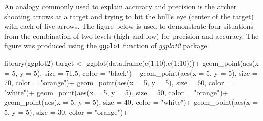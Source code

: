 \documentclass[
  letterpaper,
  DIV=11,
  numbers=noendperiod]{scrreprt}
\newenvironment{Shaded}{\begin{snugshade}}{\end{snugshade}}
\newcommand{\AttributeTok}[1]{\textcolor[rgb]{0.40,0.45,0.13}{#1}}
\newcommand{\DecValTok}[1]{\textcolor[rgb]{0.68,0.00,0.00}{#1}}
\newcommand{\FloatTok}[1]{\textcolor[rgb]{0.68,0.00,0.00}{#1}}
\newcommand{\FunctionTok}[1]{\textcolor[rgb]{0.28,0.35,0.67}{#1}}
\newcommand{\NormalTok}[1]{\textcolor[rgb]{0.00,0.23,0.31}{#1}}
\newcommand{\OtherTok}[1]{\textcolor[rgb]{0.00,0.23,0.31}{#1}}
\newcommand{\SpecialCharTok}[1]{\textcolor[rgb]{0.37,0.37,0.37}{#1}}
\newcommand{\StringTok}[1]{\textcolor[rgb]{0.13,0.47,0.30}{#1}}
\begin{document}
An analogy commonly used to explain accuracy and precision is the archer
shooting arrows at a target and trying to hit the bull's eye (center of
the target) with each of five arrows. The figure below is used to
demonstrate four situations from the combination of two levels (high and
low) for precision and accuracy. The figure was produced using the
\texttt{ggplot} function of \emph{ggplot2} package.

\begin{Shaded}
\begin{Highlighting}[]
\FunctionTok{library}\NormalTok{(ggplot2)}
\NormalTok{target }\OtherTok{\textless{}{-}} 
  \FunctionTok{ggplot}\NormalTok{(}\FunctionTok{data.frame}\NormalTok{(}\FunctionTok{c}\NormalTok{(}\DecValTok{1}\SpecialCharTok{:}\DecValTok{10}\NormalTok{),}\FunctionTok{c}\NormalTok{(}\DecValTok{1}\SpecialCharTok{:}\DecValTok{10}\NormalTok{)))}\SpecialCharTok{+}
  \FunctionTok{geom\_point}\NormalTok{(}\FunctionTok{aes}\NormalTok{(}\AttributeTok{x =} \DecValTok{5}\NormalTok{, }\AttributeTok{y =} \DecValTok{5}\NormalTok{), }\AttributeTok{size =} \FloatTok{71.5}\NormalTok{, }\AttributeTok{color =} \StringTok{"black"}\NormalTok{)}\SpecialCharTok{+}
  \FunctionTok{geom\_point}\NormalTok{(}\FunctionTok{aes}\NormalTok{(}\AttributeTok{x =} \DecValTok{5}\NormalTok{, }\AttributeTok{y =} \DecValTok{5}\NormalTok{), }\AttributeTok{size =} \DecValTok{70}\NormalTok{, }\AttributeTok{color =} \StringTok{"orange"}\NormalTok{)}\SpecialCharTok{+}
  \FunctionTok{geom\_point}\NormalTok{(}\FunctionTok{aes}\NormalTok{(}\AttributeTok{x =} \DecValTok{5}\NormalTok{, }\AttributeTok{y =} \DecValTok{5}\NormalTok{), }\AttributeTok{size =} \DecValTok{60}\NormalTok{, }\AttributeTok{color =} \StringTok{"white"}\NormalTok{)}\SpecialCharTok{+}
  \FunctionTok{geom\_point}\NormalTok{(}\FunctionTok{aes}\NormalTok{(}\AttributeTok{x =} \DecValTok{5}\NormalTok{, }\AttributeTok{y =} \DecValTok{5}\NormalTok{), }\AttributeTok{size =} \DecValTok{50}\NormalTok{, }\AttributeTok{color =} \StringTok{"orange"}\NormalTok{)}\SpecialCharTok{+}
  \FunctionTok{geom\_point}\NormalTok{(}\FunctionTok{aes}\NormalTok{(}\AttributeTok{x =} \DecValTok{5}\NormalTok{, }\AttributeTok{y =} \DecValTok{5}\NormalTok{), }\AttributeTok{size =} \DecValTok{40}\NormalTok{, }\AttributeTok{color =} \StringTok{"white"}\NormalTok{)}\SpecialCharTok{+}
  \FunctionTok{geom\_point}\NormalTok{(}\FunctionTok{aes}\NormalTok{(}\AttributeTok{x =} \DecValTok{5}\NormalTok{, }\AttributeTok{y =} \DecValTok{5}\NormalTok{), }\AttributeTok{size =} \DecValTok{30}\NormalTok{, }\AttributeTok{color =} \StringTok{"orange"}\NormalTok{)}\SpecialCharTok{+}

\end{Highlighting}
\end{Shaded}
\end{document}
